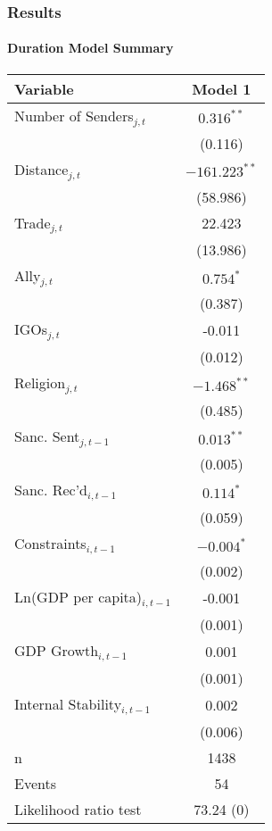 \begin{frame}
\frametitle{Results}
\framesubtitle{Duration Model Summary}

\begin{table}[ht]
\centering
{\tiny
\begin{tabular}{lc}
 Variable & Model 1 \\ 
  \hline
\hline
Number of Senders$_{j,t}$ & $0.316^{\ast\ast}$ \\ 
   & (0.116) \\ 
  Distance$_{j,t}$ & $-161.223^{\ast\ast}$ \\ 
   & (58.986) \\ 
  Trade$_{j,t}$ & 22.423 \\ 
   & (13.986) \\ 
  Ally$_{j,t}$ & $0.754^{\ast}$ \\ 
   & (0.387) \\ 
  IGOs$_{j,t}$ & -0.011 \\ 
   & (0.012) \\ 
  Religion$_{j,t}$ & $-1.468^{\ast\ast}$ \\ 
   & (0.485) \\ 
   \hline
Sanc. Sent$_{j,t-1}$ & $0.013^{\ast\ast}$ \\ 
   & (0.005) \\ 
  Sanc. Rec'd$_{i,t-1}$ & $0.114^{\ast}$ \\ 
   & (0.059) \\ 
   \hline
Constraints$_{i,t-1}$ & $-0.004^{\ast}$ \\ 
   & (0.002) \\ 
  Ln(GDP per capita)$_{i,t-1}$ & -0.001 \\ 
   & (0.001) \\ 
  GDP Growth$_{i,t-1}$ & 0.001 \\ 
   & (0.001) \\ 
  Internal Stability$_{i,t-1}$ & 0.002 \\ 
   & (0.006) \\ 
   \hline
n & 1438 \\ 
  Events & 54 \\ 
  Likelihood ratio test & 73.24 (0) \\ 
   \hline
\hline
\end{tabular}
}
\end{table}


\end{frame}


